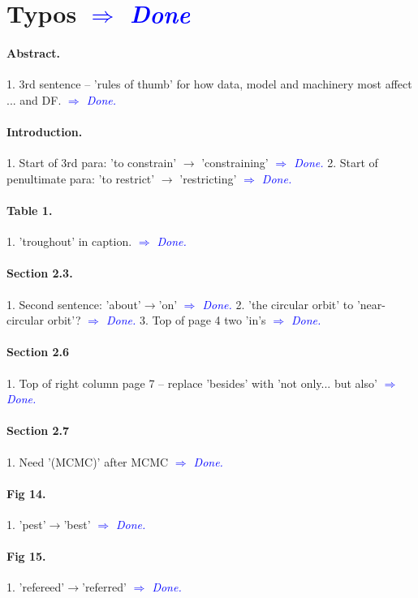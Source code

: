 \documentclass[10pt,a4paper]{article}
\newcommand{\Comment}[1]{\textsl{\textcolor{Blue}{$\Longrightarrow$ {#1}}}}
\begin{document}
\section{Typos \Comment{Done}}

\paragraph{Abstract.} 1. 3rd sentence -- 'rules of thumb' for how data, model and machinery most affect ... and DF. \Comment{Done.}

\paragraph{Introduction.} 1. Start of 3rd para: 'to constrain' $\rightarrow$ 'constraining'  \Comment{Done.} 2. Start of penultimate para: 'to restrict' $\rightarrow$ 'restricting' \Comment{Done.}

\paragraph{Table 1.} 1. 'troughout' in caption. \Comment{Done.}

\paragraph{Section 2.3.} 1. Second sentence: 'about'$\rightarrow$'on' \Comment{Done.} 2. 'the circular orbit' to 'near-circular orbit'? \Comment{Done.} 3. Top of page 4 two 'in's \Comment{Done.}

\paragraph{Section 2.6} 1. Top of right column page 7 -- replace 'besides' with 'not only... but also' \Comment{Done.}

\paragraph{Section 2.7} 1. Need '(MCMC)' after MCMC \Comment{Done.}

\paragraph{Fig 14.} 1. 'pest'$\rightarrow$'best' \Comment{Done.}

\paragraph{Fig 15.} 1. 'refereed'$\rightarrow$'referred'  \Comment{Done.}
\end{document}
